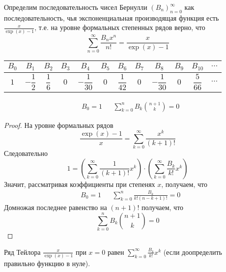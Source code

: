 \documentclass[12pt,a4paper]{article}
\begin{document}
    \begin{definition}
        Определим последовательность чисел Бернулли $(B_n)_{n=0}^\infty$ как последовательность, чья экспоненциальная производящая функция есть $\frac{x}{\exp(x) - 1}$, т.е. на уровне формальных степенных рядов верно, что
        \[\sum_{n=0}^\infty \frac{B_n x^n}{n!} = \frac{x}{\exp(x) - 1}\]

        \begin{table}[h]
            \centering
            \begin{tabular}{c|c|c|c|c|c|c|c|c|c|c|c}
                $B_0$ & $B_1$ & $B_2$ & $B_3$ & $B_4$ & $B_5$ & $B_6$ & $B_7$ & $B_8$ & $B_9$ & $B_{10}$ & $\cdots$\\
                \hline
                \rule[-10pt]{0pt}{30pt} $1$ & $-\dfrac{1}{2}$ & $\dfrac{1}{6}$ & $0$ & $-\dfrac{1}{30}$ & $0$ & $\dfrac{1}{42}$ & $0$ & $-\dfrac{1}{30}$ & $0$ & $\dfrac{5}{66}$ & $\cdots$
            \end{tabular}
        \end{table}
    \end{definition}

    \begin{lemma}
        \begin{align*}
            &B_0 = 1&
            &\sum_{k=0}^n B_k \binom{n+1}{k} = 0
        \end{align*}
    \end{lemma}

    \begin{proof}
        На уровне формальных рядов
        \[\frac{\exp(x) - 1}{x} = \sum_{k=0}^\infty \frac{x^k}{(k+1)!}\]
        Следовательно
        \[1 = \left(\sum_{k=0}^\infty \frac{1}{(k+1)!} x^k\right) \cdot \left(\sum_{k=0}^\infty \frac{B_k}{k!}x^k\right)\]
        Значит, рассматривая коэффициенты при степенях $x$, получаем, что
        \begin{align*}
            &B_0 = 1&
            &\sum_{k=0}^n \frac{B_k}{k!(n-k+1)!} = 0
        \end{align*}
        Домножая последнее равенство на $(n+1)!$ получаем, что
        \[\sum_{k=0}^n B_k \binom{n+1}{k} = 0\]
    \end{proof}

    \begin{lemma}
        Ряд Тейлора $\frac{x}{\exp(x) - 1}$ при $x = 0$ равен $\sum_{k=0}^\infty \frac{B_k}{k!}x^k$ (если доопределить правильно функцию в нуле).
    \end{lemma}
\end{document}
